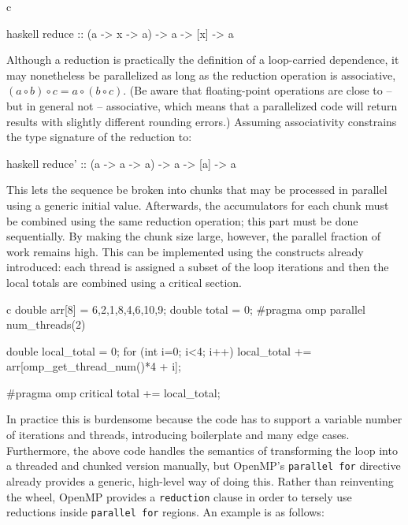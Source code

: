 \documentclass[conference, a4paper]{IEEEtran-modified}
\begin{document}
\begin{ccode}[]{c}
      \begin{ccode}[]
        {haskell}
        reduce :: (a -> x -> a) -> a -> [x] -> a\end{ccode}

Although a reduction is practically the definition of a loop-carried dependence, it may nonetheless be parallelized as long as the reduction operation is associative, $(a \circ b) \circ c = a \circ (b \circ c)$. (Be aware that floating-point operations are close to -- but in general not -- associative, which means that a parallelized code will return results with slightly different rounding errors.) Assuming associativity constrains the type signature of the reduction to: 

      \begin{ccode}[]
        {haskell}
        reduce' :: (a -> a -> a) -> a -> [a] -> a\end{ccode}

This lets the sequence be broken into chunks that may be processed in parallel using a generic initial value. Afterwards, the accumulators for each chunk must be combined using the same reduction operation; this part must be done sequentially. By making the chunk size large, however, the parallel fraction of work remains high. This can be implemented using the constructs already introduced: each thread is assigned a subset of the loop iterations and then the local totals are combined using a critical section.

\begin{ccode}[]
{c}
        double arr[8] = {6,2,1,8,4,6,10,9};
        double total = 0;
        #pragma omp parallel num_threads(2)
        {
          double local_total = 0;
          for (int i=0; i<4; i++)
            local_total += arr[omp_get_thread_num()*4 + i];

          #pragma omp critical
          total += local_total;
        }
\end{ccode}

In practice this is burdensome because the code has to support a variable number of iterations and threads, introducing boilerplate and many edge cases. Furthermore, the above code handles the semantics of transforming the loop into a threaded and chunked version manually, but OpenMP's \texttt{parallel for} directive already provides a generic, high-level way of doing this. Rather than reinventing the wheel, OpenMP provides a \texttt{reduction} clause in order to tersely use reductions inside \texttt{parallel for} regions. An example is as follows:


\end{ccode}
\end{document}
